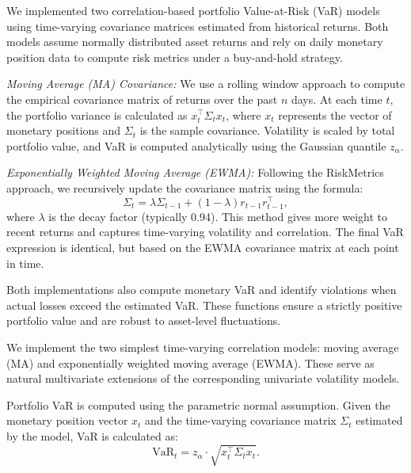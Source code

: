 \documentclass[12pt]{article}
\begin{document}
\vspace{1em}
\underline{}
\vspace{1em}
\underline{}

\vspace{0.6em}

We implemented two correlation-based portfolio Value-at-Risk (VaR) models using time-varying covariance matrices estimated from historical returns. Both models assume normally distributed asset returns and rely on daily monetary position data to compute risk metrics under a buy-and-hold strategy.

\textit{Moving Average (MA) Covariance:}  
We use a rolling window approach to compute the empirical covariance matrix of returns over the past $n$ days. At each time $t$, the portfolio variance is calculated as $x_t^\top \Sigma_t x_t$, where $x_t$ represents the vector of monetary positions and $\Sigma_t$ is the sample covariance. Volatility is scaled by total portfolio value, and VaR is computed analytically using the Gaussian quantile $z_\alpha$.

\textit{Exponentially Weighted Moving Average (EWMA):}  
Following the RiskMetrics approach, we recursively update the covariance matrix using the formula:
\[
\Sigma_t = \lambda \Sigma_{t-1} + (1 - \lambda) r_{t-1} r_{t-1}^\top,
\]
where $\lambda$ is the decay factor (typically 0.94). This method gives more weight to recent returns and captures time-varying volatility and correlation. The final VaR expression is identical, but based on the EWMA covariance matrix at each point in time.

Both implementations also compute monetary VaR and identify violations when actual losses exceed the estimated VaR. These functions ensure a strictly positive portfolio value and are robust to asset-level fluctuations.

\vspace{0.6em}

We implement the two simplest time-varying correlation models: moving average (MA) and exponentially weighted moving average (EWMA). These serve as natural multivariate extensions of the corresponding univariate volatility models.

Portfolio VaR is computed using the parametric normal assumption. Given the monetary position vector $x_t$ and the time-varying covariance matrix $\Sigma_t$ estimated by the model, VaR is calculated as:
\[
\text{VaR}_t = z_\alpha \cdot \sqrt{x_t^\top \Sigma_t x_t}.
\]
\end{document}
